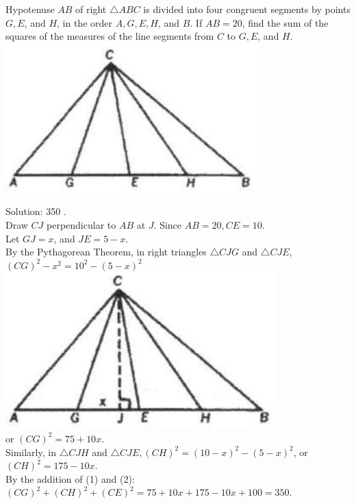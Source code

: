 \documentclass{article}
\begin{document}
Hypotenuse \(A B\) of right \(\triangle A B C\) is divided into four congruent segments by points \(G, E\), and \(H\), in the order \(A, G, E, H\), and \(B\). If \(A B=20\), find the sum of the squares of the measures of the line segments from \(C\) to \(G, E\), and \(H\).\\
\centering
\includegraphics[width=\textwidth]{images/079(2).jpg}

Solution: 350 .\\
Draw \(C J\) perpendicular to \(A B\) at \(J\). Since \(A B=20, C E=10\).\\
Let \(G J=x\), and \(J E=5-x\).\\
By the Pythagorean Theorem, in right triangles \(\triangle C J G\) and \(\triangle C J E\),\\
\((C G)^{2}-x^{2}=10^{2}-(5-x)^{2}\)\\
\centering
\includegraphics[width=\textwidth]{images/079(1).jpg}\\
or \((C G)^{2}=75+10 x\).\\
Similarly, in \(\triangle C J H\) and \(\triangle C J E,(C H)^{2}=(10-x)^{2}-(5-x)^{2}\), or \((C H)^{2}=175-10 x\).\\
By the addition of (1) and (2):\\
\((C G)^{2}+(C H)^{2}+(C E)^{2}=75+10 x+175-10 x+100=350\).
\end{document}
